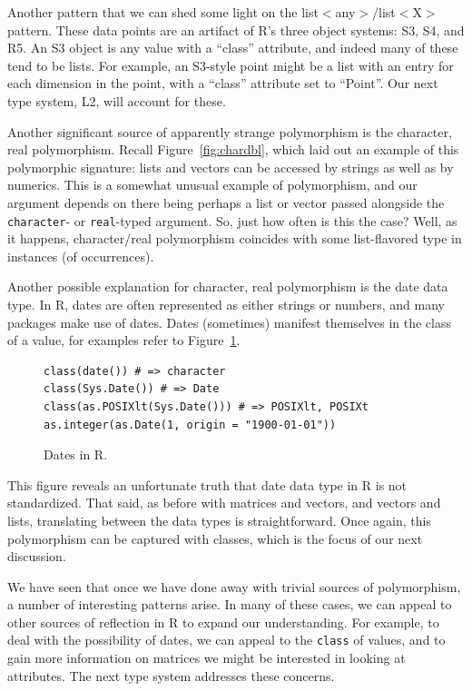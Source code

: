 \documentclass[acmsmall,10pt,review,anonymous]{acmart}\settopmatter{printfolios=true,printccs=false,printacmref=false}
\newcommand{\code}[1]{\lstinline|#1|\xspace}
\begin{document}
Another pattern that we can shed some light on the list$<$any$>$/list$<$X$>$ pattern.
These data points are an artifact of R's three object systems: S3, S4, and R5.
An S3 object is any value with a ``class'' attribute, and indeed many of these tend to be lists.
For example, an S3-style point might be a list with an entry for each dimension in the point, with a ``class'' attribute set to ``Point''.
Our next type system, L2, will account for these.

Another significant source of apparently strange polymorphism is the character, real polymorphism.
Recall Figure~\ref{fig:chardbl}, which laid out an example of this polymorphic signature: lists and vectors can be accessed by strings as well as by numerics.
This is a somewhat unusual example of polymorphism, and our argument depends on there being perhaps a list or vector passed alongside the {\tt character}- or {\tt real}-typed argument.
So, just how often is this the case?
Well, as it happens, character/real polymorphism coincides with some list-flavored type in \INDEXCOINCIDENCE instances (\INDEXYPERC of occurrences).

Another possible explanation for character, real polymorphism is the date data type.
In R, dates are often represented as either strings or numbers, and many packages make use of dates.
Dates (sometimes) manifest themselves in the class of a value, for examples refer to Figure~\ref{fig:date}.
\begin{figure}[!hb]{\small\begin{lstlisting}[style=R]
class(date()) # => character
class(Sys.Date()) # => Date
class(as.POSIXlt(Sys.Date())) # => POSIXlt, POSIXt
as.integer(as.Date(1, origin = "1900-01-01"))
\end{lstlisting}}\caption{Dates in R.}\label{fig:date}\end{figure}

This figure reveals an unfortunate truth that date data type in R is not standardized.
That said, as before with matrices and vectors, and vectors and lists, translating between the data types is straightforward.
Once again, this polymorphism can be captured with classes, which is the focus of our next discussion.

We have seen that once we have done away with trivial sources of polymorphism, a number of interesting patterns arise.
In many of these cases, we can appeal to other sources of reflection in R to expand our understanding.
For example, to deal with the possibility of dates, we can appeal to the \code{class} of values, and to gain more information on matrices we might be interested in looking at attributes.
The next type system addresses these concerns.
\end{document}
